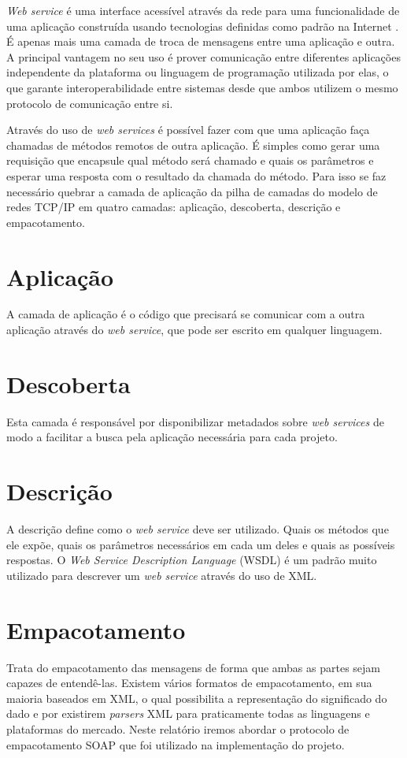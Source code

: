 \label{Cap:web_services}

\textit{Web service} é uma interface acessível através da rede para uma funcionalidade de uma aplicação construída usando tecnologias definidas como padrão na Internet \cite{ref-oreilly-soap}. É apenas mais uma camada de troca de mensagens entre uma aplicação e outra. A principal vantagem no seu uso é prover comunicação entre diferentes aplicações independente da plataforma ou linguagem de programação utilizada por elas, o que garante interoperabilidade entre sistemas desde que ambos utilizem o mesmo protocolo de comunicação entre si.

Através do uso de \textit{web services} é possível fazer com que uma aplicação faça chamadas de métodos remotos de outra aplicação. É simples como gerar uma requisição que encapsule qual método será chamado e quais os parâmetros e esperar uma resposta com o resultado da chamada do método. Para isso se faz necessário quebrar a camada de aplicação da pilha de camadas do modelo de redes TCP/IP em quatro camadas: aplicação, descoberta, descrição e empacotamento.

\section{Aplicação}

A camada de aplicação é o código que precisará se comunicar com a outra aplicação através do \textit{web service}, que pode ser escrito em qualquer linguagem.

\section{Descoberta}

Esta camada é responsável por disponibilizar metadados sobre \textit{web services} de modo a facilitar a busca pela aplicação necessária para cada projeto.

\section{Descrição}

A descrição define como o \textit{web service} deve ser utilizado. Quais os métodos que ele expõe, quais os parâmetros necessários em cada um deles e quais as possíveis respostas. O \textit{Web Service Description Language} (WSDL) é um padrão muito utilizado para descrever um \textit{web service} através do uso de XML.

\section{Empacotamento}

Trata do empacotamento das mensagens de forma que ambas as partes sejam capazes de entendê-las. Existem vários formatos de empacotamento, em sua maioria baseados em XML, o qual possibilita a representação do significado do dado e por existirem \textit{parsers} XML para praticamente todas as linguagens e plataformas do mercado. Neste relatório iremos abordar o protocolo de empacotamento SOAP que foi utilizado na implementação do projeto.

